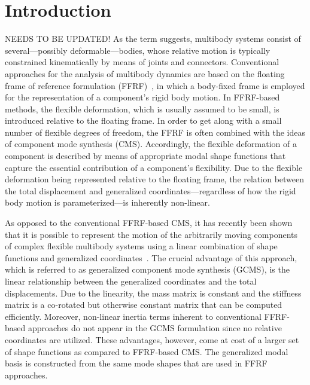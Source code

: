 \section{Introduction}
\label{sec-introduction}
NEEDS TO BE UPDATED!
As the term suggests, multibody systems consist of several---possibly deformable---bodies, whose relative motion is typically constrained kinematically by means of joints and connectors.
Conventional approaches for the analysis of multibody dynamics are based on the floating frame of reference formulation (FFRF)~\cite{Shabana13}, in which a body-fixed frame is employed for the representation of a component's rigid body motion.
In FFRF-based methods, the flexible deformation, which is usually assumed to be small, is introduced relative to the floating frame.
In order to get along with a small number of flexible degrees of freedom, the FFRF is often combined with the ideas of component mode synthesis (CMS). 
Accordingly, the flexible deformation of a component is described by means of appropriate modal shape functions that capture the essential contribution of a component's flexibility.
Due to the flexible deformation being represented relative to the floating frame, the relation between the total displacement and generalized coordinates---regardless of how the rigid body motion is parameterized---is inherently non-linear. 

As opposed to the conventional FFRF-based CMS, it has recently been shown that it is possible to represent the motion of the arbitrarily moving components of complex flexible multibody systems using a linear combination of shape functions and generalized coordinates~\cite{gerstmayr2008,pechstein2013,humerziegler2013}. 
The crucial advantage of this approach, which is referred to as generalized component mode synthesis (GCMS), is the linear relationship between the generalized coordinates and the total displacements.
Due to the linearity, the mass matrix is constant and the stiffness matrix is a co-rotated but otherwise constant matrix that can be computed efficiently. 
Moreover, non-linear inertia terms inherent to conventional FFRF-based approaches do not appear in the GCMS formulation since no relative coordinates are utilized.
These advantages, however, come at cost of a larger set of shape functions as compared to FFRF-based CMS.
The generalized modal basis is constructed from the same mode shapes that are used in FFRF approaches.  

